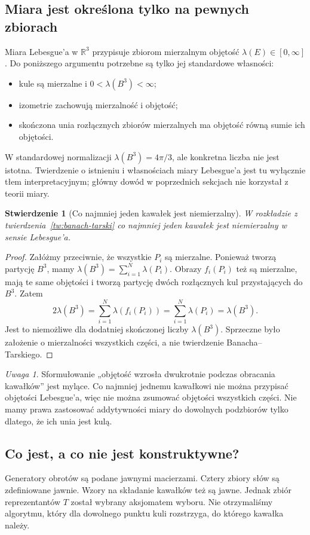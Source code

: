 \documentclass[11pt,a4paper]{article}
\numberwithin{equation}{section}
\theoremstyle{plain}
\newtheorem{stwierdzenie}[twierdzenie]{Stwierdzenie}
\theoremstyle{definition}
\theoremstyle{remark}
\newtheorem{uwaga}[twierdzenie]{Uwaga}
\newcommand{\R}{\mathbb R}
\begin{document}
\subsection{Miara jest określona tylko na pewnych zbiorach}
Miara Lebesgue'a w $\R^3$ przypisuje zbiorom mierzalnym objętość $\lambda(E)\in[0,\infty]$. Do poniższego argumentu potrzebne są tylko jej standardowe własności:
\begin{itemize}
\item kule są mierzalne i $0<\lambda(B^3)<\infty$;
\item izometrie zachowują mierzalność i objętość;
\item skończona unia rozłącznych zbiorów mierzalnych ma objętość równą sumie ich objętości.
\end{itemize}
W standardowej normalizacji $\lambda(B^3)=4\pi/3$, ale konkretna liczba nie jest istotna. Twierdzenie o istnieniu i własnościach miary Lebesgue'a jest tu wyłącznie tłem interpretacyjnym; główny dowód w poprzednich sekcjach nie korzystał z teorii miary.
\begin{stwierdzenie}[Co najmniej jeden kawałek jest niemierzalny]\label{st:niemierzalnosc}
W rozkładzie z twierdzenia~\ref{tw:banach-tarski} co najmniej jeden kawałek jest niemierzalny w sensie Lebesgue'a.
\end{stwierdzenie}
\begin{proof}
Załóżmy przeciwnie, że wszystkie $P_i$ są mierzalne. Ponieważ tworzą partycję $B^3$, mamy $\lambda(B^3)=\sum_{i=1}^{N}\lambda(P_i)$. Obrazy $f_i(P_i)$ też są mierzalne, mają te same objętości i tworzą partycję dwóch rozłącznych kul przystających do $B^3$. Zatem
\[
 2\lambda(B^3)=\sum_{i=1}^{N}\lambda(f_i(P_i))=
 \sum_{i=1}^{N}\lambda(P_i)=\lambda(B^3).
\]
Jest to niemożliwe dla dodatniej skończonej liczby $\lambda(B^3)$. Sprzeczne było założenie o mierzalności wszystkich części, a nie twierdzenie Banacha--Tarskiego.
\end{proof}
\begin{uwaga}
Sformułowanie „objętość wzrosła dwukrotnie podczas obracania kawałków” jest mylące. Co najmniej jednemu kawałkowi nie można przypisać objętości Lebesgue'a, więc nie można zsumować objętości wszystkich części. Nie mamy prawa zastosować addytywności miary do dowolnych podzbiorów tylko dlatego, że ich unia jest kulą.
\end{uwaga}

\subsection{Co jest, a co nie jest konstruktywne?}
Generatory obrotów są podane jawnymi macierzami. Cztery zbiory słów są zdefiniowane jawnie. Wzory na składanie kawałków też są jawne. Jednak zbiór reprezentantów $T$ został wybrany aksjomatem wyboru. Nie otrzymaliśmy algorytmu, który dla dowolnego punktu kuli rozstrzyga, do którego kawałka należy.
\end{document}
